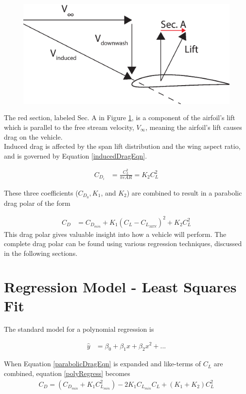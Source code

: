 \begin{figure}[H]
  \centering
  \includegraphics[width=.6\linewidth]{figures/inducedDrag.eps}
  \label{inducedDrag}
\end{figure}

The red section, labeled Sec. A in Figure \ref{inducedDrag}, is a component of the airfoil's lift which is parallel to the free stream velocity, $V_\infty$, meaning the airfoil's lift causes drag on the vehicle.\\

Induced drag is affected by the span lift distribution and the wing aspect ratio\cite{prandtl1923applications}, and is governed by Equation \ref{inducedDragEqn}.

\begin{align}
\label{inducedDragEqn}
C_{D_i} &= \frac{C^2_L}{\pi e AR} = K_2 C^2_L
\end{align}

These three coefficients ($C_{D_0},K_1$, and $K_2$) are combined to result in a parabolic drag polar of the form 

\begin{align}
\label{parabolicDragEqn}
C_D &= C_{D_{min}} + K_1(C_L-C_{L_{MIN}})^2 + K_2C^2_L
\end{align}
This drag polar gives valuable insight into how a vehicle will perform. The complete drag polar can be found using various regression techniques, discussed in the following sections.

\section{Regression Model - Least Squares Fit}
The standard model for a polynomial regression is

\begin{align}
\label{polyRegress}
\hat{y} &= \beta_0 + \beta_1x + \beta_2x^2+...
\end{align}

When Equation \ref{parabolicDragEqn} is expanded and like-terms of $C_L$ are combined, equation \ref{polyRegress} becomes
\begin{align}
C_D = (C_{D_{min}} + K_1 C^2_{L_{min}}) -2K_1C_{L_{min}}C_L+(K_1+K_2)C^2_L
\end{align}

